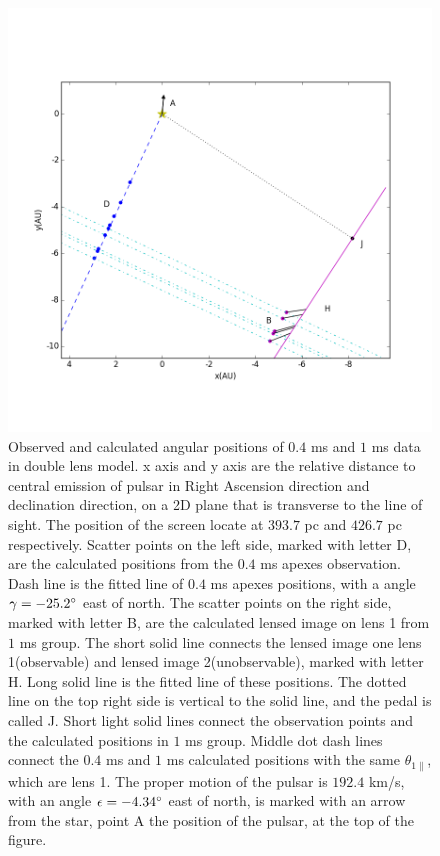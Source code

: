 \documentclass[useAMS,usenatbib]{mn2e}
\begin{document}
\begin{figure}
\centering
\includegraphics[width=1.0\textwidth, angle=0]{Double_lens_xy.png}
\caption{Observed and calculated angular positions of $0.4$ ms and $1$ ms data in double lens model. x axis and y axis are the relative distance to central emission of pulsar in Right Ascension direction and declination direction, on a 2D plane that is transverse to the line of sight. The position of the screen locate at $393.7$ pc and $426.7$ pc respectively. Scatter points on the left side, marked with letter D, are the calculated positions from the $0.4$ ms apexes observation. Dash line is the fitted line of $0.4$ ms apexes positions, with a angle $\gamma=-25.2\degree$  east of north. The scatter points on the right side, marked with letter B, are the calculated lensed image on lens 1 from $1$ ms group. The short solid line connects the lensed image one lens 1(observable) and lensed image 2(unobservable), marked with letter H. Long solid line is the fitted line of these positions. The dotted line on the top right side is vertical to the solid line, and the pedal is called J. Short light solid lines connect the observation points and the calculated positions in $1$ ms group. Middle dot dash lines connect the $0.4$ ms and $1$ ms calculated positions with the same $\theta_{1\parallel}$, which are lens 1. The proper motion of the pulsar is $192.4$ km/s, with an angle $\epsilon=-4.34\degree$ east of north, is marked with an arrow from the star, point A the position of the pulsar, at the top of the figure.}
\label{Doublelens}
\end{figure}
\end{document}
